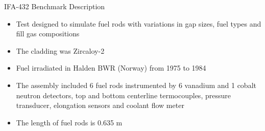\begin{frame}{IFA-432 Benchmark Description}
  \footnotesize 

    \begin{block}{}
        \begin{itemize}
            \item Test designed to simulate fuel rods with variations in gap sizes, fuel types and fill gas compositions
            \item The cladding was Zircaloy-2 
            \item Fuel irradiated in Halden BWR (Norway) from 1975 to 1984
            \item The assembly included 6 fuel rods instrumented by 6 vanadium and 1 cobalt neutron detectors,
                  top and bottom centerline termocouples, pressure transducer, elongation sensors and coolant
                  flow meter
            \item The length of fuel rods is 0.635 m
        \end{itemize}
    \end{block}

\end{frame}
